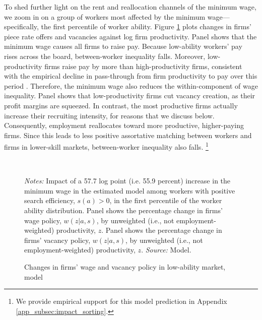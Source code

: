 To shed further light on the rent and reallocation channels of the minimum wage, we zoom in on a group of workers most affected by the minimum wage---specifically, the first percentile of worker ability. Figure \ref{figure: minimum wage mechanics} plots changes in firms' piece rate offers and vacancies against log firm productivity. Panel  shows that the minimum wage causes all firms to raise pay. Because low-ability workers' pay rises across the board, between-worker inequality falls. Moreover, low-productivity firms raise pay by more than high-productivity firms, consistent with the empirical decline in pass-through from firm productivity to pay over this period \citep{ABEM2018}. Therefore, the minimum wage also reduces the within-component of wage inequality. Panel  shows that low-productivity firms cut vacancy creation, as their profit margins are squeezed. In contrast, the most productive firms actually increase their recruiting intensity, for reasons that we discuss below. Consequently, employment reallocates toward more productive, higher-paying firms. Since this leads to less positive assortative matching between workers and firms in lower-skill markets, between-worker inequality also falls.%
%
\footnote{We provide empirical support for this model prediction in Appendix \ref{app_subsec:impact_sorting}.} %
%
\begin{figure}[!htb]
  \centering
  \caption{Changes in firms' wage and vacancy policy in low-ability market, model\label{figure: minimum wage mechanics}}
  \prefigvspace
  \\
  \postfigvspace
  \begin{minipage}[t]{1\columnwidth}%
    \begin{spacing}{0.75}
      {\scriptsize \textit{Notes:} Impact of a 57.7 log point (i.e. 55.9 percent) increase in the minimum wage in the estimated model among workers with positive search efficiency, $s(a)>0$, in the first percentile of the worker ability distribution. Panel  shows the percentage change in firms' wage policy, $w(z|a,s)$, by unweighted (i.e., not employment-weighted) productivity, $z$. Panel  shows the percentage change in firms' vacancy policy, $w(z|a,s)$, by unweighted (i.e., not employment-weighted) productivity, $z$. %
      \textit{Source:} Model.}
    \end{spacing}
  \end{minipage}
\end{figure}


